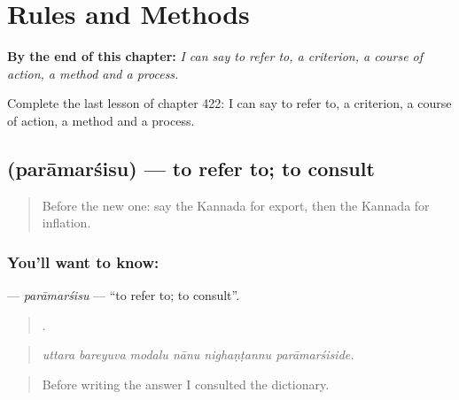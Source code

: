 
\chapter{Rules and Methods}
\label{ch:ka-rules-and-methods}

\begin{chapteropening}
\textbf{By the end of this chapter:} \emph{I can say to refer to, a criterion, a course of action, a method and a process.}

Complete the last lesson of chapter 422: I can say to refer to, a criterion, a course of action, a method and a process.
\end{chapteropening}

\section[\texorpdfstring{\kn{ಪರಾಮರ್ಶಿಸು} (parāmarśisu)}{ಪರಾಮರ್ಶಿಸು (parāmarśisu)}]{ (parāmarśisu) — to refer to; to consult}

\label{lesson:KA-C422-paramarsisu}



\begin{quote}
Before the new one: say the Kannada for export, then the Kannada for inflation.
\end{quote}

\subsection*{You'll want to know: }
\textbf{} — \emph{parāmarśisu} — \textquotedblleft{}to refer to; to consult\textquotedblright{}.

\begin{quote}
     .
\end{quote}

\begin{quote}
\emph{uttara bareyuva modalu nānu nighaṇṭannu parāmarśiside.}
\end{quote}

\begin{quote}
Before writing the answer I consulted the dictionary.
\end{quote}

